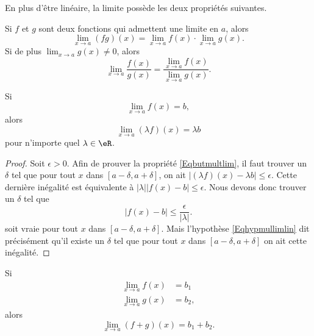 En plus d'être linéaire, la limite possède les deux propriétés suivantes.
\begin{proposition}     \label{PROPooDQFIooMMwxxJ}
	Si $f$ et $g$ sont deux fonctions qui admettent une limite en $a$, alors
	\begin{equation}
		\lim_{x\to a} (fg)(x)=\lim_{x\to a} f(x)\cdot\lim_{x\to a} g(x).
	\end{equation}
	Si de plus $\lim_{x\to a} g(x)\neq 0$, alors
	\begin{equation}
		\lim_{x\to a} \frac{ f(x) }{ g(x) }=\frac{ \lim_{x\to a} f(x) }{ \lim_{x\to a} g(x) }.
	\end{equation}
\end{proposition}

\begin{theorem}     \label{ThoLimLinMul}
    Si
    \begin{equation} \label{Eqhypmullimlin}
      \lim_{x\to a}f(x)=b,
    \end{equation}
    alors
    \begin{equation} \label{Eqbutmultlim}
      \lim_{x\to a}(\lambda f)(x)=\lambda b
    \end{equation}
    pour n'importe quel $\lambda\in\eR$.
\end{theorem}

\begin{proof}
Soit $\epsilon>0$. Afin de prouver la propriété \eqref{Eqbutmultlim}, il faut trouver un $\delta$ tel que pour tout $x$ dans $[a-\delta,a+\delta]$, on ait $| (\lambda f)(x)- \lambda b |\leq\epsilon$. Cette dernière inégalité est équivalente à $|\lambda|| f(x)-b |\leq\epsilon$. Nous devons donc trouver un $\delta$ tel que
\begin{equation}
| f(x)-b |\leq\frac{ \epsilon }{ | \lambda | }.
\end{equation}
soit vraie pour tout $x$ dans $[a-\delta,a+\delta]$. Mais l'hypothèse \eqref{Eqhypmullimlin} dit précisément qu'il existe un $\delta$ tel que pour tout $x$ dans $[a-\delta,a+\delta]$ on ait cette inégalité.
\end{proof}

\begin{theorem}     \label{ThoLimLin}
    Si
    \begin{subequations}
    \begin{align}
        \lim_{x\to a}f(x)&=b_1\\
        \lim_{x\to a}g(x)&=b_2,
    \end{align}
    \end{subequations}
    alors
    \begin{equation}
        \lim_{x\to a}(f+g)(x)=b_1+b_2.
    \end{equation}
\end{theorem}

